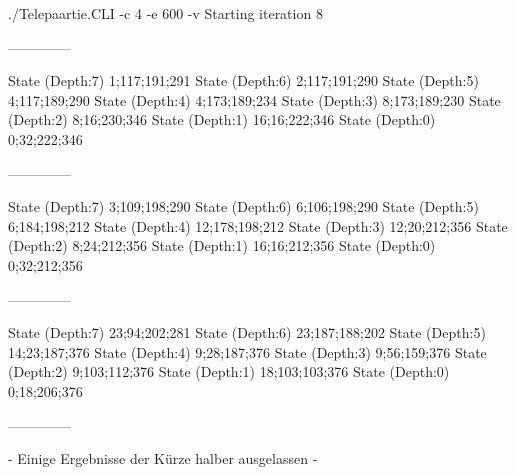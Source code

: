 \documentclass[a4paper,10pt,ngerman]{scrartcl}
\begin{document}
\begin{lstcs}
./Telepaartie.CLI -c 4 -e 600 -v
Starting iteration 8

--------------

State (Depth:7) {1;117;191;291}
State (Depth:6) {2;117;191;290}
State (Depth:5) {4;117;189;290}
State (Depth:4) {4;173;189;234}
State (Depth:3) {8;173;189;230}
State (Depth:2) {8;16;230;346}
State (Depth:1) {16;16;222;346}
State (Depth:0) {0;32;222;346}

--------------

State (Depth:7) {3;109;198;290}
State (Depth:6) {6;106;198;290}
State (Depth:5) {6;184;198;212}
State (Depth:4) {12;178;198;212}
State (Depth:3) {12;20;212;356}
State (Depth:2) {8;24;212;356}
State (Depth:1) {16;16;212;356}
State (Depth:0) {0;32;212;356}

--------------

State (Depth:7) {23;94;202;281}
State (Depth:6) {23;187;188;202}
State (Depth:5) {14;23;187;376}
State (Depth:4) {9;28;187;376}
State (Depth:3) {9;56;159;376}
State (Depth:2) {9;103;112;376}
State (Depth:1) {18;103;103;376}
State (Depth:0) {0;18;206;376}

--------------
\end{lstcs}

- Einige Ergebnisse der Kürze halber ausgelassen -







\end{document}
